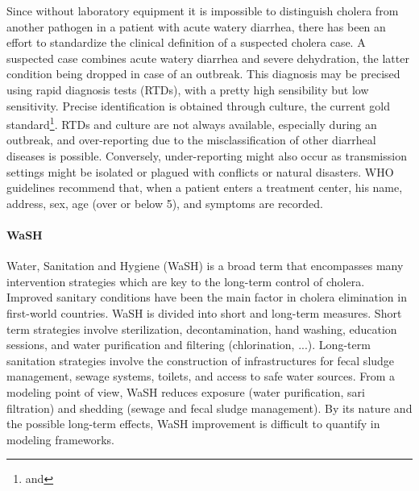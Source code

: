 Since without laboratory equipment it is impossible to distinguish cholera from another pathogen in a patient with acute watery diarrhea, there has been an effort to standardize the clinical definition of a suspected cholera case. %
A suspected case combines acute watery diarrhea and severe dehydration, the latter condition being dropped in case of an outbreak. This diagnosis may be precised using rapid diagnosis tests (RTDs), with a pretty high sensibility but low sensitivity. Precise identification is obtained through culture, the current gold standard\footnote{ and }. RTDs and culture are not always available, especially during an outbreak, and over-reporting due to the misclassification of other diarrheal diseases is possible. Conversely, under-reporting might also occur as transmission settings might be isolated or plagued with conflicts or natural disasters. WHO guidelines recommend that, when a patient enters a treatment center, his name, address, sex, age (over or below 5), and symptoms are recorded\cite{WHO:FirstStepsManaging:2010}. %

\paragraph{WaSH} Water, Sanitation and Hygiene (WaSH) is a broad term that encompasses many intervention strategies which are key to the long-term control of cholera. Improved sanitary conditions have been the main factor in cholera elimination in first-world countries. WaSH is divided into short and long-term measures. Short term strategies involve sterilization, decontamination, hand washing, education sessions, and water purification and filtering (chlorination, ...)\cite[-2\baselineskip]{Rebaudet:NationalAlertresponseStrategy:2018,Fewtrell:WaterSanitationHygiene:2005}. Long-term sanitation strategies involve the construction of infrastructures for fecal sludge management, sewage systems, toilets, and access to safe water sources. From a modeling point of view, WaSH reduces exposure (water purification, sari filtration\cite{Colwell:ReductionCholeraBangladeshi:2003}) and shedding (sewage and fecal sludge management). By its nature and the possible long-term effects, WaSH improvement is difficult to quantify in modeling frameworks.

